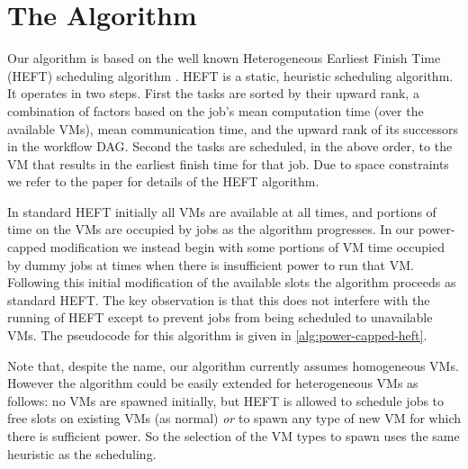 \documentclass[10pt, conference, compsocconf]{IEEEtran} %
\begin{document}
\section{The Algorithm}

Our algorithm is based on the well known Heterogeneous Earliest Finish Time (HEFT) scheduling algorithm \cite{Topcuoglu2002heft}.
HEFT is a static, heuristic scheduling algorithm.
It operates in two steps.
First the tasks are sorted by their upward rank, a combination of factors based on the job's mean computation time (over the available VMs), mean communication time, and the upward rank of its successors in the workflow DAG.
Second the tasks are scheduled, in the above order, to the VM that results in the earliest finish time for that job.
Due to space constraints we refer to the paper \cite{Topcuoglu2002heft} for details of the HEFT algorithm.

In standard HEFT initially all VMs are available at all times, and portions of time on the VMs are occupied by jobs as the algorithm progresses.
In our power-capped modification we instead begin with some portions of VM time occupied by dummy jobs at times when there is insufficient power to run that VM.
Following this initial modification of the available slots the algorithm proceeds as standard HEFT.
The key observation is that this does not interfere with the running of HEFT except to prevent jobs from being scheduled to unavailable VMs.
The pseudocode for this algorithm is given in \cref{alg:power-capped-heft}.

Note that, despite the name, our algorithm currently assumes homogeneous VMs.
However the algorithm could be easily extended for heterogeneous VMs as follows: no VMs are spawned initially, but HEFT is allowed to schedule jobs to free slots on existing VMs (as normal) \emph{or} to spawn any type of new VM for which there is sufficient power.
So the selection of the VM types to spawn uses the same heuristic as the scheduling.


\end{document}

